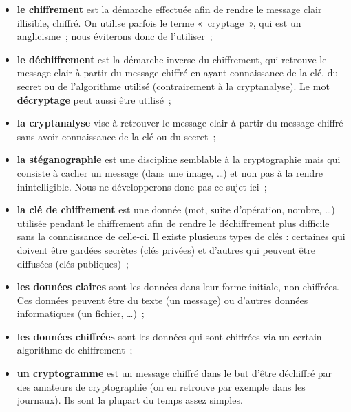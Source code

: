\begin{itemize}

\item {\sffamily\textbf{le chiffrement}} est la démarche effectuée afin de rendre
  le message clair illisible, chiffré. On utilise parfois le terme
  «~cryptage~», qui est un anglicisme~; nous éviterons donc de
  l'utiliser~;

\item {\sffamily\textbf{le déchiffrement}} est la démarche inverse du chiffrement, qui retrouve
  le message clair à partir du message chiffré en ayant connaissance
  de la clé, du secret ou de l'algorithme utilisé (contrairement à la
  cryptanalyse). Le mot {\sffamily\textbf{décryptage}} peut aussi
être utilisé~;
\item {\sffamily\textbf{la cryptanalyse}} vise à retrouver le
message clair à partir du message chiffré sans avoir connaissance
de la clé ou du secret~;

\item {\sffamily\textbf{la stéganographie}} est une discipline semblable à la
  cryptographie mais qui consiste à cacher un message (dans une
  image, \dots) et non pas à la rendre inintelligible. Nous ne
développerons donc pas ce sujet ici~;

\item {\sffamily\textbf{la clé de chiffrement}} est une donnée (mot, suite d'opération,
  nombre, \dots) utilisée pendant le chiffrement afin de rendre le
  déchiffrement plus difficile sans la connaissance de celle-ci. Il
  existe plusieurs types de clés : certaines qui doivent être gardées
  secrètes (clés privées) et d'autres qui peuvent être diffusées
  (clés publiques)~;

\item {\sffamily\textbf{les données claires}} sont les données dans leur forme initiale, non
  chiffrées. Ces données peuvent être du texte (un message) ou d'autres
  données informatiques (un fichier, \dots)~;

\item {\sffamily\textbf{les données chiffrées}} sont les données qui
sont chiffrées via un certain
  algorithme de chiffrement~;

\item {\sffamily\textbf{un cryptogramme}} est un message chiffré
dans le but d'être déchiffré par des amateurs de cryptographie (on
en retrouve par exemple dans les journaux). Ils sont la plupart du
temps assez simples.
\end{itemize}
